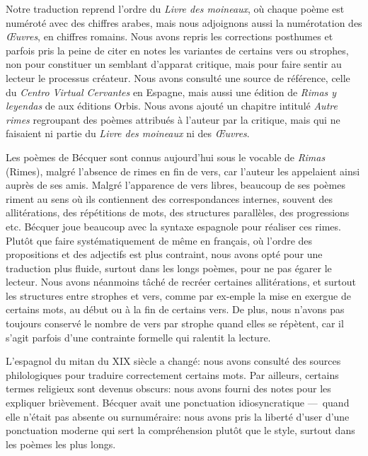 \documentclass[a4paper,fontsize=13pt,twoside,final]{scrbook}
\begin{document}
\pagestyle{empty}

Notre traduction reprend l'ordre du \emph{Livre des moineaux}, où
chaque poème est numéroté avec des chiffres arabes, mais nous
adjoignons aussi la numérotation des \emph{Œuvres}, en chiffres
romains. Nous avons repris les corrections posthumes et parfois pris
la peine de citer en notes les variantes de certains vers ou strophes,
non pour constituer un semblant d'apparat critique, mais pour faire
sentir au lecteur le processus créateur. Nous avons consulté une
source de référence, celle du \emph{Centro Virtual Cervantes} en
Espagne, mais aussi une édition de \emph{Rimas y leyendas}
de  aux éditions Orbis. Nous avons ajouté un
chapitre intitulé \emph{Autre rimes} regroupant des poèmes attribués à
l'auteur par la critique, mais qui ne faisaient ni partie
du \emph{Livre des moineaux} ni des
\emph{Œuvres}.

Les poèmes de Bécquer sont connus aujourd'hui sous le vocable de
\emph{Rimas} (Rimes), malgré l'absence de rimes en fin de vers, car
l'auteur les appelaient ainsi auprès de ses amis. Malgré l'apparence
de vers libres, beaucoup de ses poèmes riment au sens où ils
contiennent des correspondances internes, souvent des allitérations,
des répétitions de mots, des structures parallèles, des progressions
etc. Bécquer joue beaucoup avec la syntaxe espagnole pour réaliser ces
rimes. Plutôt que faire systématiquement de même en français, où
l'ordre des propositions et des adjectifs est plus contraint, nous
avons opté pour une traduction plus fluide, surtout dans les longs
poèmes, pour ne pas égarer le lecteur. Nous avons néanmoins tâché de
recréer certaines allitérations, et surtout les structures entre
strophes et vers, comme par ex-emple la mise en exergue de certains
mots, au début ou à la fin de certains vers. De plus, nous n'avons pas
toujours conservé le nombre de vers par strophe quand elles se
répètent, car il s'agit parfois d'une contrainte formelle qui ralentit
la lecture.

L'espagnol du mitan du XIX\ieme{} siècle a changé: nous avons
consulté des sources philologiques pour traduire correctement certains
mots. Par ailleurs, certains termes religieux sont devenus obscurs:
nous avons fourni des notes pour les expliquer brièvement. Bécquer
avait une ponctuation idiosyncratique ---~quand elle n'était pas
absente ou surnuméraire: nous avons pris la liberté d'user d'une
ponctuation moderne qui sert la compréhension plutôt que le style,
surtout dans les poèmes les plus longs.
\end{document}
